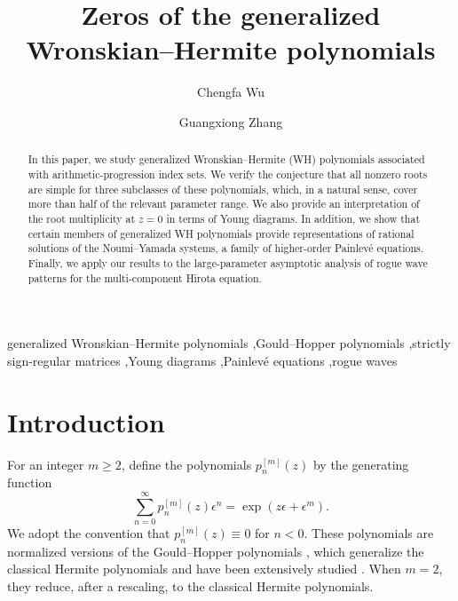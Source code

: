\documentclass[preprint,3p,10pt]{elsarticle}
\theoremstyle{definition}
\begin{document}
\small
\begin{frontmatter}


\title{Zeros of the generalized Wronskian--Hermite polynomials}

\author[szu_ias,szu_sms]{Chengfa Wu}
\author[szu_ias]{Guangxiong Zhang}


\begin{abstract}
In this paper, we study generalized Wronskian--Hermite (WH) polynomials associated with arithmetic-progression index sets.  We verify the conjecture that all nonzero roots are simple for three subclasses of these polynomials, which, in a natural sense, cover more than half of the relevant parameter range. We also provide an interpretation of the root multiplicity at \(z=0\) in terms of Young diagrams. In addition, we show that certain members of generalized WH polynomials provide representations of rational solutions of
the Noumi--Yamada systems, a family of higher-order Painlev\'e equations.
Finally, we apply our results to the large-parameter
asymptotic analysis of rogue wave patterns for the multi-component Hirota
equation.
\end{abstract}

\begin{keyword}
generalized Wronskian--Hermite polynomials \sep Gould--Hopper polynomials 
\sep strictly sign-regular matrices \sep Young diagrams \sep Painlev\'e equations \sep rogue waves
\end{keyword}

\end{frontmatter}

\setcounter{tocdepth}{2}
\tableofcontents


\section{Introduction}

For an integer \(m\ge2\), define the polynomials \( p_n^{[m]}(z) \) by the generating function
\begin{equation}\label{eq:p-generating-intro} \sum_{n=0}^{\infty}p_n^{[m]}(z)\epsilon^n = \exp(z\epsilon+\epsilon^m).
\end{equation} 
We adopt the convention that \(p_n^{[m]}(z)\equiv0\) for \(n<0\). These polynomials
are normalized versions of the Gould--Hopper polynomials \cite{GouldHopper1962}, which generalize the classical Hermite polynomials and have been extensively studied \cite{feigin2021quasi,vignat2013proof,chang2011gould,romdhane2008zeros}. When $m=2$, they reduce,  after a rescaling, to the classical Hermite polynomials.
\end{document}
